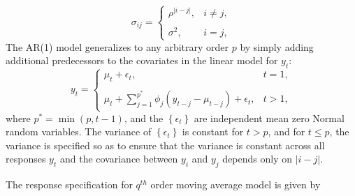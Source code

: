 \begin{equation}\label{eq:compound-symmetric-model}
\sigma_{ij} = \left\{ \begin{array}{lr}
\rho^{\vert i - j \vert}, & i \ne j,\\
& \\
\sigma^2, & i = j, 
\end{array}\right.
\end{equation}
\bigskip
\noindent
The AR(1) model generalizes to any arbitrary order $p$ by simply adding additional predecessors to the covariates in the linear model for $y_t$:
\begin{equation*}
y_{t} = \left\{ \begin{array}{lr}
\mu_t + \epsilon_t, & t = 1,\\
& \\
\mu_t + \sum\limits_{j = 1}^{p^*} \phi_j\left(y_{t-j} - \mu_{t-j}\right) + \epsilon_t, & t > 1,
\end{array}\right.
\end{equation*}
\noindent
where $p^* = \min\left(p,t-1\right)$, and the $\left\{\epsilon_t\right\}$ are independent mean zero Normal random variables. The variance of $\left\{\epsilon_t\right\}$ is constant for $t > p$, and for $t \le p$, the variance is specified so as to ensure that the variance is constant across all responses $y_t$ and the covariance between $y_i$ and $y_j$ depends only on $\vert i - j\vert$. 

\bigskip

The response specification for $q^{th}$ order moving average model  is given by 

